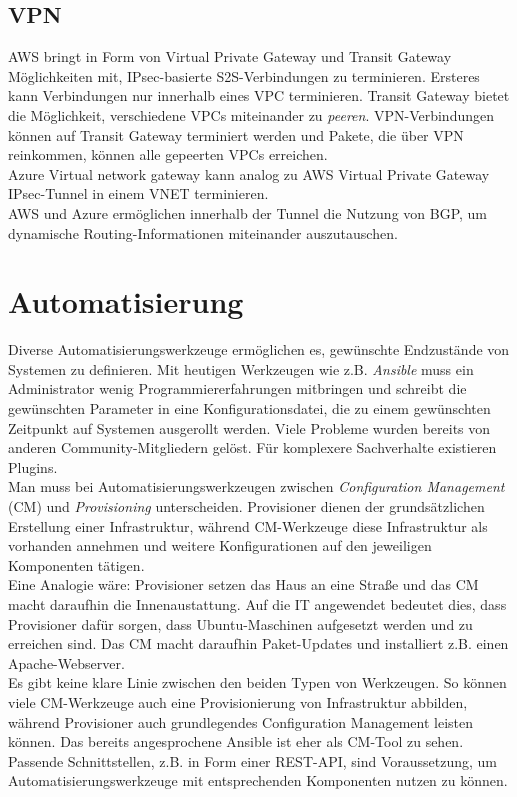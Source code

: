 \subsection{VPN}
AWS bringt in Form von Virtual Private Gateway und Transit Gateway Möglichkeiten mit, IPsec-basierte S2S-Verbindungen zu terminieren. Ersteres kann Verbindungen nur innerhalb eines VPC terminieren. Transit Gateway bietet die Möglichkeit, verschiedene VPCs miteinander zu \textit{peeren}. VPN-Verbindungen können auf Transit Gateway terminiert werden und Pakete, die über VPN reinkommen, können alle gepeerten VPCs erreichen.\\
Azure Virtual network gateway kann analog zu AWS Virtual Private Gateway IPsec-Tunnel in einem VNET terminieren.\\
AWS und Azure ermöglichen innerhalb der Tunnel die Nutzung von BGP, um dynamische Routing-Informationen miteinander auszutauschen.


\section{Automatisierung}\label{automatisierung}

Diverse Automatisierungswerkzeuge ermöglichen es, gewünschte Endzustände von Systemen zu definieren. Mit heutigen Werkzeugen wie z.B. \textit{Ansible} muss ein Administrator wenig Programmiererfahrungen mitbringen und schreibt die gewünschten Parameter in eine Konfigurationsdatei, die zu einem gewünschten Zeitpunkt auf Systemen ausgerollt werden. Viele Probleme wurden bereits von anderen Community-Mitgliedern gelöst. Für komplexere Sachverhalte existieren Plugins.\\
Man muss bei Automatisierungswerkzeugen zwischen \textit{Configuration Management} (CM) und \textit{Provisioning} unterscheiden. Provisioner dienen der grundsätzlichen Erstellung einer Infrastruktur, während CM-Werkzeuge diese Infrastruktur als vorhanden annehmen und weitere Konfigurationen auf den jeweiligen Komponenten tätigen\cite[S.20]{Brikman2019}.\\
Eine Analogie wäre: Provisioner setzen das Haus an eine Straße und das CM macht daraufhin die Innenaustattung. Auf die IT angewendet bedeutet dies, dass Provisioner dafür sorgen, dass Ubuntu-Maschinen aufgesetzt werden und zu erreichen sind. Das CM macht daraufhin Paket-Updates und installiert z.B. einen Apache-Webserver.\\
Es gibt keine klare Linie zwischen den beiden Typen von Werkzeugen. So können viele CM-Werkzeuge auch eine Provisionierung von Infrastruktur abbilden, während Provisioner auch grundlegendes Configuration Management leisten können\cite[S.20]{Brikman2019}. Das bereits angesprochene Ansible ist eher als CM-Tool zu sehen.\\
Passende Schnittstellen, z.B. in Form einer REST-API, sind Voraussetzung, um Automatisierungswerkzeuge mit entsprechenden Komponenten nutzen zu können.

